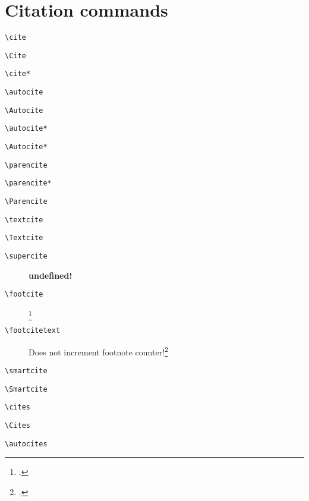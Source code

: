 \documentclass[a4paper,12pt,twoside]{scrartcl}
\newcommand*{\Befehl}[1]{\texttt{\textbackslash#1}}
\begin{document}
\section{Citation commands}

\begin{description}
    \item[\Befehl{cite}] \cite[159--187]{auler:hiller:2015}
    \item[\Befehl{Cite}] \Cite[159--187]{auler:hiller:2015}
    \item[\Befehl{cite*}] \cite*[159--187]{auler:hiller:2015}
    \item[\Befehl{autocite}] \autocite[159--187]{auler:hiller:2015a}
    \item[\Befehl{Autocite}] \Autocite[159--187]{auler:hiller:2015a}
    \item[\Befehl{autocite*}] \autocite*[159--187]{auler:hiller:2015a}
    \item[\Befehl{Autocite*}] \Autocite*[159--187]{auler:hiller:2015a}
    \item[\Befehl{parencite}] \parencite[159--187]{auler:hiller:2015}
    \item[\Befehl{parencite*}] \parencite*[159--187]{auler:hiller:2015}
    \item[\Befehl{Parencite}] \Parencite[159--187]{auler:hiller:2015}
    \item[\Befehl{textcite}] \textcite[159--187]{auler:hiller:2015}
    \item[\Befehl{Textcite}] \Textcite[159--187]{auler:hiller:2015}
	\item[\Befehl{supercite}] 
        {\supercite[433]{bauchhenss:et:al:1978}}
        {\textbf{undefined!}}%
    \item[\Befehl{footcite}] \footcite[159--187]{auler:hiller:2015}
	\item[\Befehl{footcitetext}] Does not increment footnote counter!\footcitetext[159--187]{auler:hiller:2015}
    \item[\Befehl{smartcite}] \smartcite[159--187]{auler:hiller:2015}
    \item[\Befehl{Smartcite}] \smartcite[159--187]{auler:hiller:2015}
    \item[\Befehl{cites}] \cites[159--187]{auler:hiller:2015}
    \item[\Befehl{Cites}] \Cites[159--187]{auler:hiller:2015}
    \item[\Befehl{autocites}] \autocites[68]{auler:hiller:2011}[48]{auler:hiller:2015a}[159--187]{auler:hiller:2015}[40--41]{auler:hiller:2016}[15--23]{tacitus:1981}[19]{de:neck:yoder:1978}

\end{description}
\end{document}
